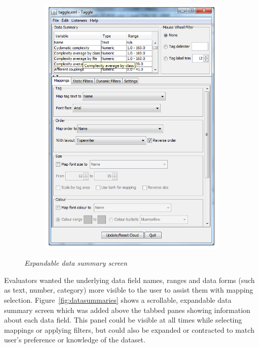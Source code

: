 \begin{figure}[!htb]
\begin{subfigure}{.5\textwidth}
\end{subfigure}%
\begin{subfigure}{.5\textwidth}
	\centering
	\includegraphics[scale=1.20]{datasummary2.png}
\end{subfigure}
\caption{\textit{Expandable data summary screen}}
\label{fig:datasummaries}
\end{figure}

Evaluators wanted the underlying data field names, ranges and data forms (such as text, number, category) more visible to the user to assist them with mapping selection. Figure~\vref{fig:datasummaries} shows a scrollable, expandable data summary screen which was added above the tabbed panes showing information about each data field. This panel could be visible at all times while selecting mappings or applying filters, but could also be expanded or contracted to match user's preference or knowledge of the dataset.

